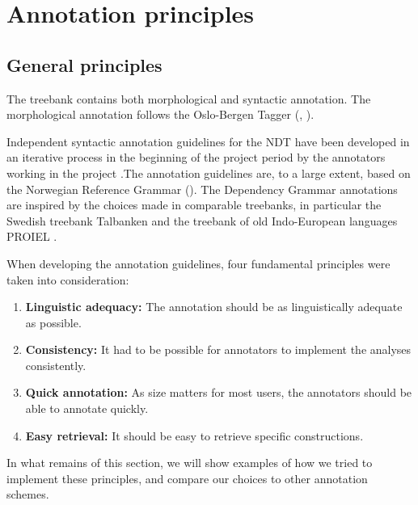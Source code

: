 \documentclass[10pt,a4paper]{article}
\begin{document}

\section{Annotation principles}
\subsection{General principles}


The treebank contains both morphological and syntactic annotation. The morphological annotation follows the Oslo-Bergen Tagger (, ).

Independent syntactic annotation guidelines for the NDT have been developed in an iterative process in the beginning of the project period by the annotators working in the project \cite{Kin:Sol:Eri:2013}.The annotation guidelines are, to a large extent, based on the Norwegian Reference Grammar (). The Dependency Grammar annotations are  inspired by the choices made in comparable treebanks, in particular the Swedish treebank Talbanken \cite{Niv:Nil:Hal:2006} and the treebank of old Indo-European languages PROIEL \cite{Hau:Joh:Eck:Wel:Her:Mut:2009}.

When developing the annotation guidelines, four fundamental principles were taken into consideration:
\begin{enumerate}
 \item \textbf{Linguistic adequacy:} The annotation should be as linguistically adequate as possible.
 \item \textbf{Consistency:} It had to be possible for annotators to implement the analyses consistently.
 \item \textbf{Quick annotation:} As size matters for most users, the annotators should be able to annotate quickly.
 \item \textbf{Easy retrieval:} It should be easy to retrieve specific constructions.
\end{enumerate}
In what remains of this section, we will show examples of how we tried to implement these principles, and compare our choices to other annotation schemes.
\end{document}
